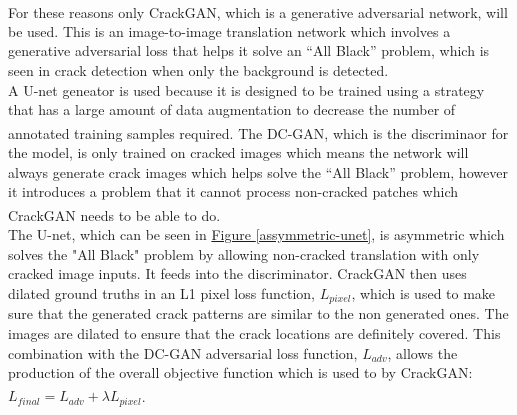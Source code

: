 \documentclass[11pt]{article}		%
\newcommand{\supercite}[1]{\textsuperscript{\cite{#1}}}		%
\newcommand{\figref}[1]{\hyperref[#1]{Figure \ref*{#1}}}    %
\newcommand{\tableref}[1]{\hyperref[#1]{Table \ref*{#1}}}     %
\begin{document}
	        \\
            \hspace*{2ex}For these reasons only CrackGAN\supercite{CrackGAN1}, 
            which is a generative adversarial network, will be used. This is an image-to-image translation network which involves a generative adversarial loss that helps it solve an “All Black” problem, which is seen in crack detection when only the background is detected. 
            \\
            \hspace*{2ex}
            A U-net geneator is used because it is designed to be trained using a strategy that has a large amount of data augmentation to decrease the number of annotated training samples required\supercite{U-Net}. The DC-GAN, which is the discriminaor for the model, is only trained on cracked images which means the network will always generate crack images which helps solve the “All Black” problem, however it introduces a problem that it cannot process non-cracked patches which CrackGAN needs to be able to do\supercite{CrackGAN1}.
            \\
            \hspace*{2ex}The U-net, which can be seen in \figref{assymmetric-unet}, is asymmetric which solves the "All Black" problem by allowing non-cracked translation with only cracked image inputs. %
             It feeds into the discriminator. CrackGAN then uses dilated ground truths in an L1 pixel loss function, $L_{pixel}$, which is used to make sure that the generated crack patterns are similar to the non generated ones. The images are dilated to ensure that the crack locations are definitely covered. This combination with the DC-GAN adversarial loss function, $L_{adv}$, allows the production of the overall objective function which is used to by CrackGAN: $L_{final}=L_{adv}+\lambda L_{pixel}$\supercite{CrackGAN1}.
			
\end{document}
